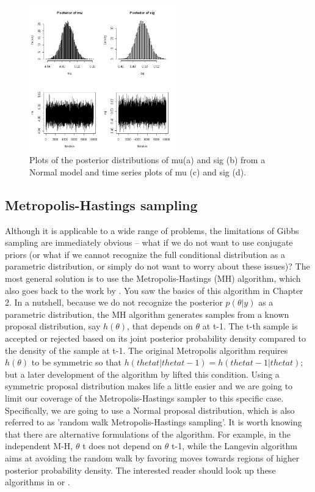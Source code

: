 \begin{figure}
\begin{center}
\includegraphics[width=2.5in]{figs/plotsofPD}
\end{center}
\caption{Plots of the posterior distributions of mu(a) and sig (b)
  from a Normal model and time series plots of mu (c) and sig (d).}
\label{plotsofPD.fig}
\end{figure}

\subsection{ Metropolis-Hastings sampling   }
Although it is applicable to a wide range of problems, the limitations of Gibbs sampling are immediately obvious – what if we do not want to use conjugate priors (or what if we cannot recognize the full conditional distribution as a parametric distribution, or simply do not want to worry about these issues)? The most general solution is to use the Metropolis-Hastings (MH) algorithm, which also goes back to the work by \citet{metropolis_ulam:1953}. You saw the basics of this algorithm in Chapter 2. In a nutshell, because we do not recognize the posterior $p(\theta|y)$ as a parametric distribution, the MH algorithm generates samples from a known proposal distribution, say $h(\theta)$, that depends on $\theta$ at t-1. The t-th sample is accepted or rejected based on its joint posterior probability density compared to the density of the sample at t-1. The original Metropolis algorithm requires $h(\theta)$ to be symmetric so that $h(thetat|thetat-1) = h(thetat-1|thetat)$; but a later development of the algorithm by \citet{hastings:1970} lifted this condition. Using a symmetric proposal distribution makes life a little easier and we are going to limit our coverage of the Metropolis-Hastings sampler to this specific case. Specifically, we are going to use a Normal proposal distribution, which is also referred to as 'random walk Metropolis-Hastings sampling'. It is worth knowing that there are alternative formulations of the algorithm. For example, in the independent M-H, $\theta$ t does not depend on $\theta$ t-1, while the Langevin algorithm \citep{roberts_etal:1998} aims at avoiding the random walk by favoring moves towards regions of higher posterior probability density. The interested reader should look up these algorithms in \citet{robert_casella:2004} or \citet{robert_casella:2010}.

